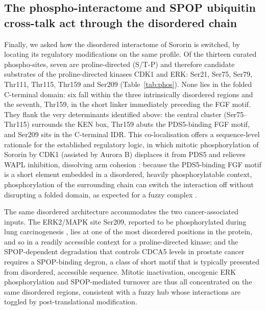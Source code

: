 \documentclass[11pt]{article}
\begin{document}
\FloatBarrier
\subsection{The phospho-interactome and SPOP ubiquitin cross-talk act through the disordered chain}
Finally, we asked how the disordered interactome of Sororin is switched, by locating its regulatory modifications on the same profile. Of the thirteen curated phospho-sites, seven are proline-directed (S/T-P) and therefore candidate substrates of the proline-directed kinases CDK1 and ERK: Ser21, Ser75, Ser79, Thr111, Thr115, Thr159 and Ser209 (Table~\ref{tab:phos}). None lies in the folded C-terminal domain: six fall within the three intrinsically disordered regions and the seventh, Thr159, in the short linker immediately preceding the FGF motif. They flank the very determinants identified above: the central cluster (Ser75--Thr115) surrounds the KEN box, Thr159 abuts the PDS5-binding FGF motif, and Ser209 sits in the C-terminal IDR. This co-localisation offers a sequence-level rationale for the established regulatory logic, in which mitotic phosphorylation of Sororin by CDK1 (assisted by Aurora B) displaces it from PDS5 and relieves WAPL inhibition, dissolving arm cohesion \citep{nishiyama2013,dreier2011}: because the PDS5-binding FGF motif is a short element embedded in a disordered, heavily phosphorylatable context, phosphorylation of the surrounding chain can switch the interaction off without disrupting a folded domain, as expected for a fuzzy complex \citep{tompa2008,fuxreiter2018}.

The same disordered architecture accommodates the two cancer-associated inputs. The ERK2/MAPK site Ser209, reported to be phosphorylated during lung carcinogenesis \citep{nguyen2010}, lies at one of the most disordered positions in the protein, and so in a readily accessible context for a proline-directed kinase; and the SPOP-dependent degradation that controls CDCA5 levels in prostate cancer \citep{zhang2021} requires a SPOP-binding degron, a class of short motif that is typically presented from disordered, accessible sequence. Mitotic inactivation, oncogenic ERK phosphorylation and SPOP-mediated turnover are thus all concentrated on the same disordered regions, consistent with a fuzzy hub whose interactions are toggled by post-translational modification.
\end{document}
